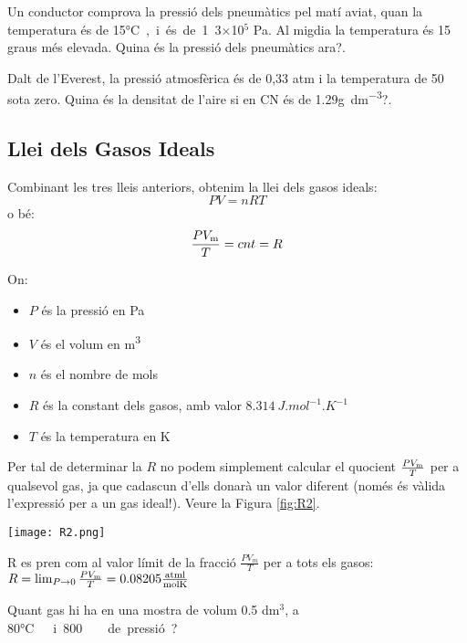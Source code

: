 \begin{exr}
    Un conductor comprova la pressió dels pneumàtics pel matí aviat, quan la temperatura és de 15\si\degreeCelsius, i és de 1.3$\times$10$^5$ Pa. Al migdia la temperatura és 15 graus més elevada. Quina és la pressió dels pneumàtics ara?.
    \end{exr}

      
    \begin{exr}
        Dalt de l'Everest, la pressió atmosfèrica és de 0,33 atm i la temperatura de 50 sota zero. Quina és la densitat de l'aire si en CN és de 1.29\si{\gram\per\deci\meter\tothe{3}}?.
        \end{exr}
    

\subsection{Llei dels Gasos Ideals}
Combinant les tres lleis anteriors, obtenim la llei dels gasos ideals:
\begin{equation}
    P V = n R T
\end{equation}
o bé:
\[\frac{P V_{\rm m}}{T}= cnt = R\]

On:
\begin{itemize}
    \item \( P \) és la pressió en \si{Pa}
    \item \( V \) és el volum en \si{m^3}
    \item \( n \) és el nombre de mols
    \item \( R \) és la constant dels gasos, amb valor \( \SI{8.314}{J.mol^{-1}.K^{-1}} \)
    \item \( T \) és la temperatura en \si{K}
\end{itemize}

Per tal de determinar la $R$ no podem simplement calcular el quocient $\frac{P V_{\rm m}}{T}$ per a qualsevol gas, ja que cadascun d'ells donarà un valor diferent (només és vàlida l'expressió per a un gas ideal!). Veure la Figura \ref{fig:R2}.
\begin{marginfigure}
\centering
\texttt{[image: R2.png]}
\caption[Determinació de la constant dels gasos $R$]{R es pren com al valor límit de la fracció $\frac{P V_m}{T}$ per a tots els gasos: 
$R=\lim_{P \to 0} \frac{P V_{\rm m}}{T}= 0.08205 \frac{{\rm atm l}}{{\rm mol K}}$
}
\label{fig:R2}
\end{marginfigure}

\begin{exr}
    Quant gas hi ha en una mostra de volum 0.5 dm$^3$, a 80\si\degreeCelsius\ i 800 \si\torr\ de pressió?
    \end{exr}

